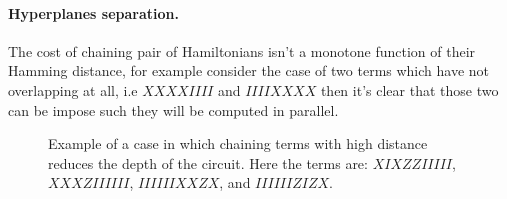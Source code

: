 \documentclass{article}
\begin{document}
\begin{multicols}{2}
\paragraph{Hyperplanes separation.} The cost of chaining pair of Hamiltonians isn't  a monotone function of their Hamming distance, for example consider the case of two terms which have not overlapping at all, i.e \( XXXXIIII \) and \(IIIIXXXX \) then it's clear that those two can be impose such they will be computed in parallel.   

\end{multicols}

\begin{figure*}[h]
  
    \caption{ Example of a case in which chaining terms with high distance reduces the depth of the circuit. Here the terms are: \(XIXZZIIIII\), \(XXXZIIIIII\), \(IIIIIIXXZX\), and \(IIIIIIZIZX\). }
    \label{fig:average-data-vs-model}
\end{figure*}
\end{document}
